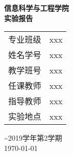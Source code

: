 \documentclass[a4paper]{ctexrep}
\begin{document}
	\begin{titlepage} %
		\begin{center}
		{ \kaishu \textbf{信息科学与工程学院}\\[0.5cm]
		\textbf{实验报告}\\[3cm]}

		\vspace*{\fill}
		{\songti
		\begin{tabular}{lc}
			专业班级& xxx\\
			姓名学号& xxx\\
			教学班号& xxx\\
			任课教师& xxx\\
			指导教师& xxx\\
			实验地点& xxx
		\end{tabular}
		}

		\vspace*{\fill}
		{ \textasciitilde 2019学年第2学期}\\[0.5cm]
		{ \songti \today}
		\end{center}
	\end{titlepage}
\tableofcontents %



%







%








\end{document}
